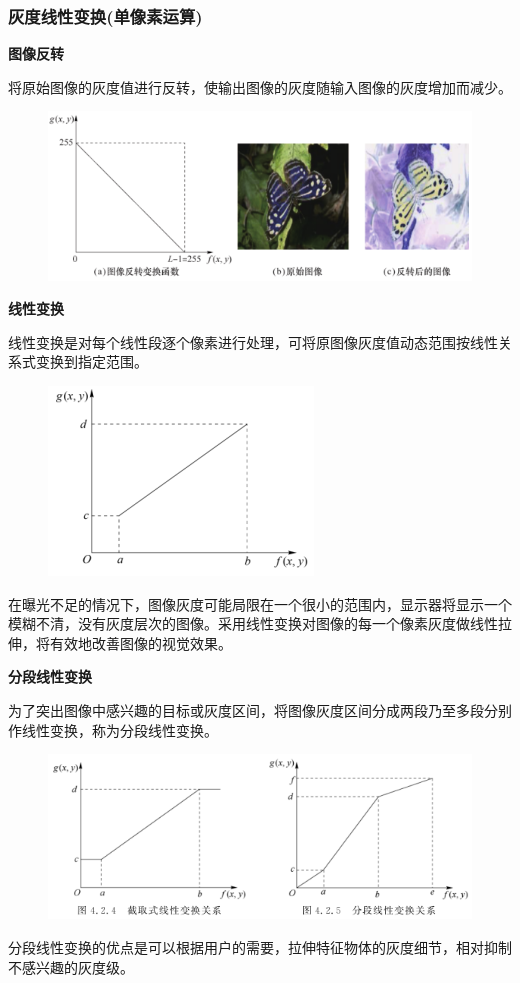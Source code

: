 \documentclass[11pt]{article}
\begin{document}
\subsubsection{灰度线性变换(单像素运算)}
\textbf{图像反转}

将原始图像的灰度值进行反转，使输出图像的灰度随输入图像的灰度增加而减少。
\begin{figure}[H]
	\centering
	\includegraphics[scale=0.5]{22}
\end{figure}

\textbf{线性变换}

线性变换是对每个线性段逐个像素进行处理，可将原图像灰度值动态范围按线性关系式变换到指定范围。

\begin{figure}[H]
	\centering
	\includegraphics[scale=0.7]{23}
\end{figure}
在曝光不足的情况下，图像灰度可能局限在一个很小的范围内，显示器将显示一个模糊不清，没有灰度层次的图像。采用线性变换对图像的每一个像素灰度做线性拉伸，将有效地改善图像的视觉效果。

\textbf{分段线性变换}

为了突出图像中感兴趣的目标或灰度区间，将图像灰度区间分成两段乃至多段分别作线性变换，称为分段线性变换。

\begin{figure}[H]
	\centering
	\includegraphics[scale=0.5]{24}
\end{figure}
分段线性变换的优点是可以根据用户的需要，拉伸特征物体的灰度细节，相对抑制不感兴趣的灰度级。
\end{document}
